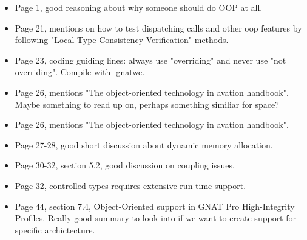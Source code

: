 \begin{itemize}
    \item Page 1, good reasoning about why someone should do OOP at all.
    \item Page 21, mentions on how to test dispatching calls and other oop
        features by following "Local Type Consistency Verification" methods.
    \item Page 23, coding guiding lines: always use "overriding" and never use
        "not overriding". Compile with -gnatwe.
    \item Page 26, mentions "The object-oriented technology in avation
        handbook". Maybe something to read up on, perhaps something similiar
        for space?
    \item Page 26, mentions "The object-oriented technology in avation
        handbook".
    \item Page 27-28, good short discussion about dynamic memory allocation.
    \item Page 30-32, section 5.2, good discussion on coupling issues.
    \item Page 32, controlled types requires extensive run-time support.
    \item Page 44, section 7.4, Object-Oriented support in GNAT Pro
        High-Integrity Profiles. Really good summary to look into if we want to
        create support for specific archictecture.
\end{itemize}
%
%
%
